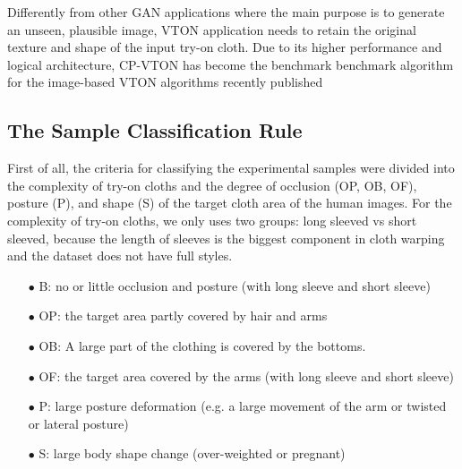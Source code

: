 Differently from other GAN applications where the main purpose is to generate an unseen, plausible image, VTON application needs to retain the original texture and shape of the input try-on cloth. Due to its higher performance and logical architecture, CP-VTON \cite{Wang2018TowardCI} has become the benchmark benchmark algorithm for the image-based VTON algorithms recently published 



 
\subsection{The Sample Classification Rule}

First of all, the criteria for classifying the experimental samples were divided into the complexity of try-on cloths and the degree of occlusion (OP, OB, OF), posture (P), and shape (S) of the target cloth area of the human images. For the complexity of try-on cloths, we only uses two groups: long sleeved vs short sleeved, because the length of sleeves is the biggest component in cloth warping and the dataset does not have full styles.    



\begin{itemize}

\item[$\bullet$] B:  no or little occlusion and posture (with long sleeve and  short sleeve)
\item[$\bullet$] OP: the target area partly covered by hair and arms
\item[$\bullet$] OB: A large part of the clothing is covered by the bottoms.
\item[$\bullet$] OF: the target area covered by the arms (with long sleeve and short sleeve)
\item[$\bullet$] P:  large posture deformation (e.g. a large movement of the arm or twisted or lateral posture)
\item[$\bullet$] S:  large body shape change  (over-weighted or pregnant)

\end{itemize}

